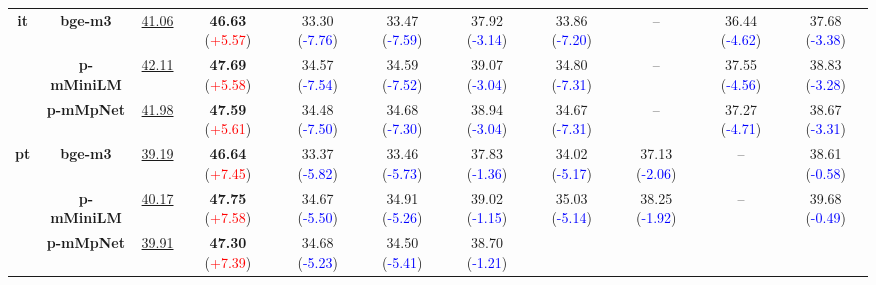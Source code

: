 \begin{table*}[!ht]
{\begin{tabular}{cc|>{\columncolor{gray!15}}c|cccccccc}
\multirow{3}{*}{\textbf{it}}
& \textbf{bge-m3}
  & \underline{41.06}
  & \textbf{46.63} {\scriptsize(\textcolor{red}{+5.57})}
  & 33.30 {\scriptsize(\textcolor{blue}{-7.76})}
  & 33.47 {\scriptsize(\textcolor{blue}{-7.59})}
  & 37.92 {\scriptsize(\textcolor{blue}{-3.14})}
  & 33.86 {\scriptsize(\textcolor{blue}{-7.20})}
  & -- 
  & 36.44 {\scriptsize(\textcolor{blue}{-4.62})}
  & 37.68 {\scriptsize(\textcolor{blue}{-3.38})} \\
& \textbf{p-mMiniLM}
  & \underline{42.11}
  & \textbf{47.69} {\scriptsize(\textcolor{red}{+5.58})}
  & 34.57 {\scriptsize(\textcolor{blue}{-7.54})}
  & 34.59 {\scriptsize(\textcolor{blue}{-7.52})}
  & 39.07 {\scriptsize(\textcolor{blue}{-3.04})}
  & 34.80 {\scriptsize(\textcolor{blue}{-7.31})}
  & -- 
  & 37.55 {\scriptsize(\textcolor{blue}{-4.56})}
  & 38.83 {\scriptsize(\textcolor{blue}{-3.28})} \\
& \textbf{p-mMpNet}
  & \underline{41.98}
  & \textbf{47.59} {\scriptsize(\textcolor{red}{+5.61})}
  & 34.48 {\scriptsize(\textcolor{blue}{-7.50})}
  & 34.68 {\scriptsize(\textcolor{blue}{-7.30})}
  & 38.94 {\scriptsize(\textcolor{blue}{-3.04})}
  & 34.67 {\scriptsize(\textcolor{blue}{-7.31})}
  & -- 
  & 37.27 {\scriptsize(\textcolor{blue}{-4.71})}
  & 38.67 {\scriptsize(\textcolor{blue}{-3.31})} \\
\midrule
\multirow{3}{*}{\textbf{pt}}
& \textbf{bge-m3}
  & \underline{39.19}
  & \textbf{46.64} {\scriptsize(\textcolor{red}{+7.45})}
  & 33.37 {\scriptsize(\textcolor{blue}{-5.82})}
  & 33.46 {\scriptsize(\textcolor{blue}{-5.73})}
  & 37.83 {\scriptsize(\textcolor{blue}{-1.36})}
  & 34.02 {\scriptsize(\textcolor{blue}{-5.17})}
  & 37.13 {\scriptsize(\textcolor{blue}{-2.06})}
  & -- 
  & 38.61 {\scriptsize(\textcolor{blue}{-0.58})} \\
& \textbf{p-mMiniLM}
  & \underline{40.17}
  & \textbf{47.75} {\scriptsize(\textcolor{red}{+7.58})}
  & 34.67 {\scriptsize(\textcolor{blue}{-5.50})}
  & 34.91 {\scriptsize(\textcolor{blue}{-5.26})}
  & 39.02 {\scriptsize(\textcolor{blue}{-1.15})}
  & 35.03 {\scriptsize(\textcolor{blue}{-5.14})}
  & 38.25 {\scriptsize(\textcolor{blue}{-1.92})}
  & -- 
  & 39.68 {\scriptsize(\textcolor{blue}{-0.49})} \\
& \textbf{p-mMpNet}
  & \underline{39.91}
  & \textbf{47.30} {\scriptsize(\textcolor{red}{+7.39})}
  & 34.68 {\scriptsize(\textcolor{blue}{-5.23})}
  & 34.50 {\scriptsize(\textcolor{blue}{-5.41})}
  & 38.70 {\scriptsize(\textcolor{blue}{-1.21})}

\end{tabular}}
\end{table*}
